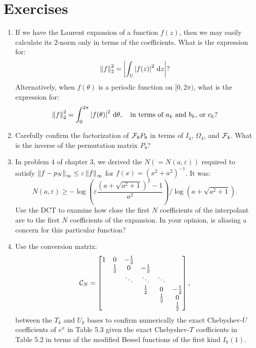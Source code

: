 \documentclass[11pt,letterpaper]{article}
\begin{document}
\section*{Exercises}

\begin{enumerate}

\item If we have the Laurent expansion of a function $f(z)$, then we may easily calculate its $2$-norm only in terms of the coefficients. What is the expression for:
\[
\left\|{f}\right\|_2^2 = \left|{\int_{\mathbb{U}} \left|{f(z)}\right|^2{\rm\,d} z}\right| ?
\]
Alternatively, when $f(\theta)$ is a periodic function on $[0,2\pi)$, what is the expression for:
\[
\left\|{f}\right\|_2^2 = \int_0^{2\pi} \left|{f(\theta)}\right|^2{\rm\,d}\theta,\quad \hbox{in terms of $a_k$ and $b_k$, or $c_k$?}
\]

\item Carefully confirm the factorization of $\mathcal{F}_8P_8$ in terms of $I_4$, $\Omega_4$, and $\mathcal{F}_4$. What is the inverse of the permutation matrix $P_8$?

\item In problem 4 of chapter 3, we derived the $N(=N(a,\varepsilon))$ required to satisfy $\left\|{f-p_N}\right\|_\infty \le \varepsilon \left\|{f}\right\|_\infty$ for $f(x) = (x^2+a^2)^{-1}$. It was:
\[
N(a,\varepsilon) \ge -\log\left(\varepsilon\dfrac{(a+\sqrt{a^2+1})^2-1}{a^2}\right)/\log(a+\sqrt{a^2+1}).
\]
Use the DCT to examine how close the first $N$ coefficients of the interpolant are to the first $N$ coefficients of the expansion. In your opinion, is aliasing a concern for this particular function?

\item Use the conversion matrix:
\[
\mathcal{C}_N = \begin{bmatrix}
1 & 0 & -\tfrac{1}{2}\\
& \tfrac{1}{2} & 0 & -\tfrac{1}{2}\\
& & \ddots & \ddots & \ddots\\
& & & \tfrac{1}{2} & 0 & -\tfrac{1}{2}\\
& & & & \tfrac{1}{2} & 0\\
& & & & & \tfrac{1}{2}\\
\end{bmatrix},
\]
between the $T_k$ and $U_k$ bases to confirm numerically the exact Chebyshev-$U$ coefficients of $e^x$ in Table 5.3 given the exact Chebyshev-$T$ coefficients in Table 5.2 in terms of the modified Bessel functions of the first kind $I_k(1)$.

\end{enumerate}
\end{document}
